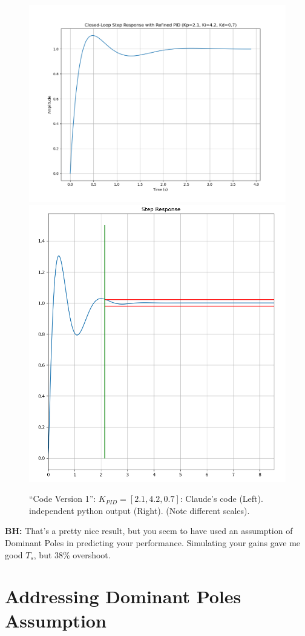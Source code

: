 \documentclass{article}
\begin{document}
\begin{figure}\centering
\includegraphics[height=0.35\textwidth]{figsapdx/M47G16cl.png}
\includegraphics[height=0.35\textwidth]{figsapdx/M47G16.png}
\caption{``Code Version 1'': $K_{PID} = [2.1,4.2,0.7]$:  Claude's code (Left).  independent python output (Right).
(Note different scales). }
\end{figure}


\textbf{BH:} That's a pretty nice result, but you seem to have used an assumption of Dominant Poles in predicting your performance. Simulating your gains gave me good $T_s$, but 38\% overshoot.

\section*{Addressing Dominant Poles Assumption}
\end{document}

